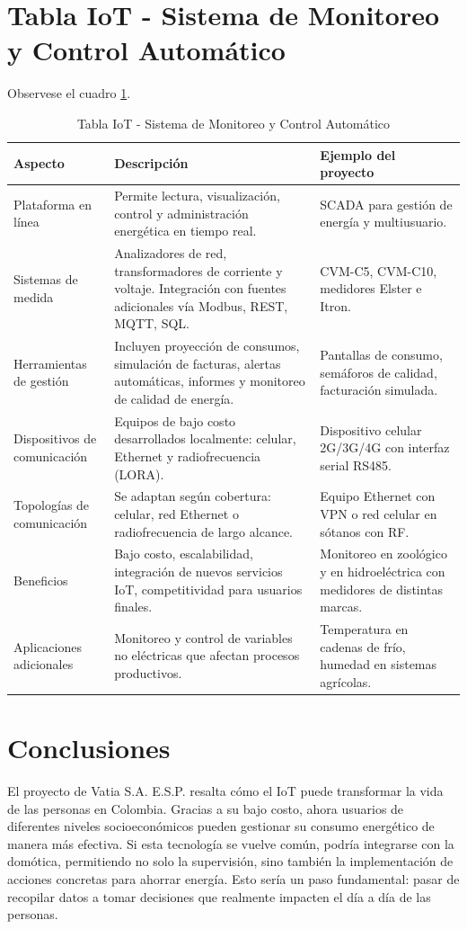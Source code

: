 \section*{Tabla IoT - Sistema de Monitoreo y Control Automático}
Observese el cuadro \ref{tab:table}. 
\begin{table}[t!]
\centering
\caption{Tabla IoT - Sistema de Monitoreo y Control Automático}
\label{tab:table}
\begin{tabular}{@{}p{3.5cm}p{6cm}p{6cm}@{}}
\toprule
\textbf{Aspecto} & \textbf{Descripción} & \textbf{Ejemplo del proyecto} \\
\midrule
Plataforma en línea & Permite lectura, visualización, control y administración energética en tiempo real. & SCADA para gestión de energía y multiusuario. \\
\addlinespace
Sistemas de medida & Analizadores de red, transformadores de corriente y voltaje. Integración con fuentes adicionales vía Modbus, REST, MQTT, SQL. & CVM-C5, CVM-C10, medidores Elster e Itron. \\
\addlinespace
Herramientas de gestión & Incluyen proyección de consumos, simulación de facturas, alertas automáticas, informes y monitoreo de calidad de energía. & Pantallas de consumo, semáforos de calidad, facturación simulada. \\
\addlinespace
Dispositivos de comunicación & Equipos de bajo costo desarrollados localmente: celular, Ethernet y radiofrecuencia (LORA). & Dispositivo celular 2G/3G/4G con interfaz serial RS485. \\
\addlinespace
Topologías de comunicación & Se adaptan según cobertura: celular, red Ethernet o radiofrecuencia de largo alcance. & Equipo Ethernet con VPN o red celular en sótanos con RF. \\
\addlinespace
Beneficios & Bajo costo, escalabilidad, integración de nuevos servicios IoT, competitividad para usuarios finales. & Monitoreo en zoológico y en hidroeléctrica con medidores de distintas marcas. \\
\addlinespace
Aplicaciones adicionales & Monitoreo y control de variables no eléctricas que afectan procesos productivos. & Temperatura en cadenas de frío, humedad en sistemas agrícolas. \\
\bottomrule
\end{tabular}
\end{table}

\section{Conclusiones}

El proyecto de Vatia S.A. E.S.P. resalta cómo el IoT puede transformar la vida de las personas en Colombia. Gracias a su bajo costo, ahora usuarios de diferentes niveles socioeconómicos pueden gestionar su consumo energético de manera más efectiva. Si esta tecnología se vuelve común, podría integrarse con la domótica, permitiendo no solo la supervisión, sino también la implementación de acciones concretas para ahorrar energía. Esto sería un paso fundamental: pasar de recopilar datos a tomar decisiones que realmente impacten el día a día de las personas.